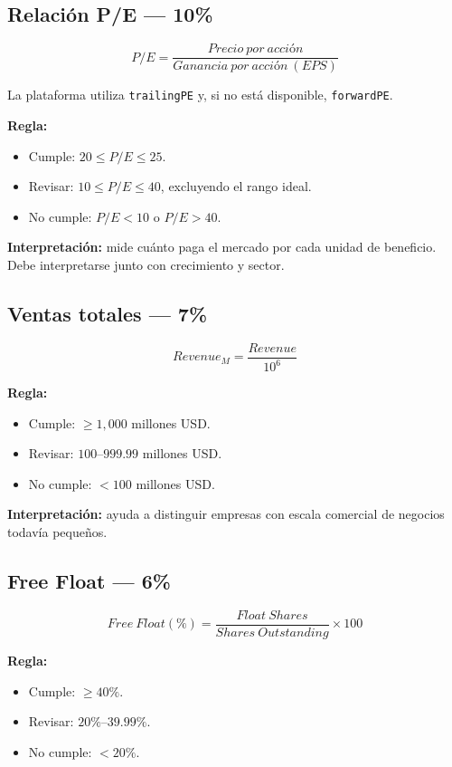\documentclass[11pt,a4paper]{article}
\begin{document}
\subsection{Relación P/E --- 10\%}
\[
\boxed{P/E=\frac{Precio\ por\ acción}{Ganancia\ por\ acción\ (EPS)}}
\]

La plataforma utiliza \texttt{trailingPE} y, si no está disponible, \texttt{forwardPE}.

\textbf{Regla:}
\begin{itemize}[leftmargin=*]
\item Cumple: $20\leq P/E\leq25$.
\item Revisar: $10\leq P/E\leq40$, excluyendo el rango ideal.
\item No cumple: $P/E<10$ o $P/E>40$.
\end{itemize}

\textbf{Interpretación:} mide cuánto paga el mercado por cada unidad de beneficio. Debe interpretarse junto con crecimiento y sector.

\subsection{Ventas totales --- 7\%}
\[
\boxed{Revenue_M=\frac{Revenue}{10^6}}
\]

\textbf{Regla:}
\begin{itemize}[leftmargin=*]
\item Cumple: $\geq1{,}000$ millones USD.
\item Revisar: $100$--$999.99$ millones USD.
\item No cumple: $<100$ millones USD.
\end{itemize}

\textbf{Interpretación:} ayuda a distinguir empresas con escala comercial de negocios todavía pequeños.

\subsection{Free Float --- 6\%}
\[
\boxed{
Free\ Float(\%)=
\frac{Float\ Shares}{Shares\ Outstanding}\times100
}
\]

\textbf{Regla:}
\begin{itemize}[leftmargin=*]
\item Cumple: $\geq40\%$.
\item Revisar: $20\%$--$39.99\%$.
\item No cumple: $<20\%$.
\end{itemize}
\end{document}
